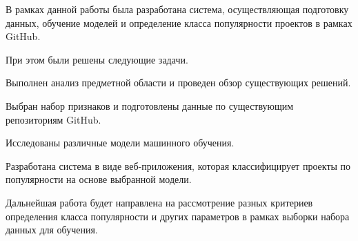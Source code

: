 \newpage
{}
\label{sec:Conclusion}

В рамках данной работы была разработана система, осуществляющая подготовку данных, обучение моделей и определение класса популярности проектов в рамках GitHub.

При этом были решены следующие задачи.

\begin{enumerateparendot}
    \item Выполнен анализ предметной области и проведен обзор существующих решений.

    \item Выбран набор признаков и подготовлены данные по существующим репозиториям GitHub.

   \item Исследованы различные модели машинного обучения.

    \item Разработана система в виде веб-приложения, которая классифицирует проекты по популярности на основе выбранной модели.
\end{enumerateparendot}
\vspace{1em}

Дальнейшая работа будет направлена на рассмотрение разных критериев определения класса популярности и других параметров в рамках выборки набора данных для обучения.